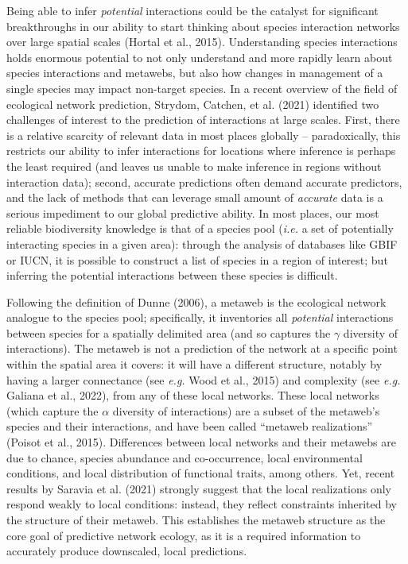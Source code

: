 \documentclass[10pt,oneside]{article}
\begin{document}
Being able to infer \emph{potential} interactions could be the catalyst
for significant breakthroughs in our ability to start thinking about
species interaction networks over large spatial scales (Hortal et al.,
2015). Understanding species interactions holds enormous potential to
not only understand and more rapidly learn about species interactions
and metawebs, but also how changes in management of a single species may
impact non-target species. In a recent overview of the field of
ecological network prediction, Strydom, Catchen, et al. (2021)
identified two challenges of interest to the prediction of interactions
at large scales. First, there is a relative scarcity of relevant data in
most places globally -- paradoxically, this restricts our ability to
infer interactions for locations where inference is perhaps the least
required (and leaves us unable to make inference in regions without
interaction data); second, accurate predictions often demand accurate
predictors, and the lack of methods that can leverage small amount of
\emph{accurate} data is a serious impediment to our global predictive
ability. In most places, our most reliable biodiversity knowledge is
that of a species pool (\emph{i.e.} a set of potentially interacting
species in a given area): through the analysis of databases like GBIF or
IUCN, it is possible to construct a list of species in a region of
interest; but inferring the potential interactions between these species
is difficult.

Following the definition of Dunne (2006), a metaweb is the ecological
network analogue to the species pool; specifically, it inventories all
\emph{potential} interactions between species for a spatially delimited
area (and so captures the \(\gamma\) diversity of interactions). The
metaweb is not a prediction of the network at a specific point within
the spatial area it covers: it will have a different structure, notably
by having a larger connectance (see \emph{e.g.} Wood et al., 2015) and
complexity (see \emph{e.g.} Galiana et al., 2022), from any of these
local networks. These local networks (which capture the \(\alpha\)
diversity of interactions) are a subset of the metaweb's species and
their interactions, and have been called ``metaweb realizations''
(Poisot et al., 2015). Differences between local networks and their
metawebs are due to chance, species abundance and co-occurrence, local
environmental conditions, and local distribution of functional traits,
among others. Yet, recent results by Saravia et al. (2021) strongly
suggest that the local realizations only respond weakly to local
conditions: instead, they reflect constraints inherited by the structure
of their metaweb. This establishes the metaweb structure as the core
goal of predictive network ecology, as it is a required information to
accurately produce downscaled, local predictions.
\end{document}
